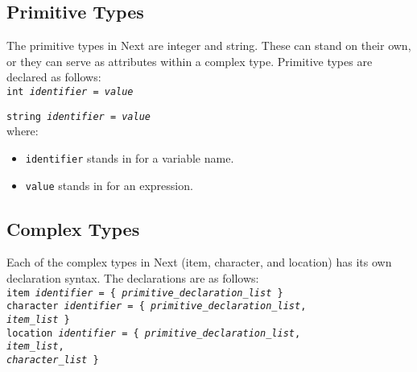 \documentclass[12pt]{article}
\begin{document}
\subsection{Primitive Types}
The primitive types in Next are integer and string.  These can stand on their own, or they can serve as attributes within a complex type.  Primitive types are declared as follows: \\

\texttt{int \textit{identifier} = \textit{value}}

\texttt{string \textit{identifier} = \textit{value}} \\

\noindent where:
\begin{itemize}
\item \texttt{identifier} stands in for a variable name.
\item \texttt{value} stands in for an expression.
\end{itemize}

\subsection{Complex Types}
Each of the complex types in Next (item, character, and location) has its own declaration syntax.  The declarations are as follows: \\

\texttt{item \textit{identifier} = \{ \textit{primitive\_declaration\_list} \}} \\

\texttt{character \textit{identifier} = \{ \textit{primitive\_declaration\_list}, \\
\indent \indent \indent \indent \indent \indent \indent \indent \indent \indent  \textit{item\_list} \} } \\

\texttt{location \textit{identifier} = \{ \textit{primitive\_declaration\_list}, \\
\indent \indent \indent \indent \indent \indent \indent \indent \indent \indent  \textit{item\_list}, \\
\indent \indent \indent \indent \indent \indent \indent \indent \indent \indent  \textit{character\_list} \}} \\
\end{document}
